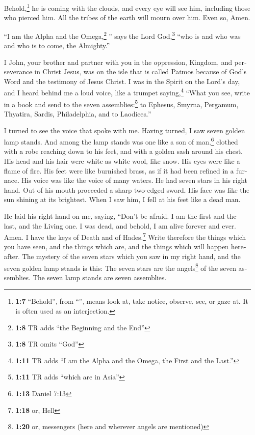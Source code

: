 \begin{paracol}{2}
\begin{otherlanguage}{english}
 Behold,\footnote{\textbf{1:7} ``Behold'', from
  ``'', means look at, take notice, observe, see, or gaze
  at. It is often used as an interjection.} he is coming with the
clouds, and every eye will see him, including those who pierced him. All
the tribes of the earth will mourn over him. Even so, Amen.

 ``I am the Alpha and the Omega,\footnote{\textbf{1:8} TR
  adds ``the Beginning and the End''} '' says the Lord God,\footnote{\textbf{1:8}
  TR omits ``God''} ``who is and who was and who is to come, the
Almighty.''

 I John, your brother and partner with you in the
oppression, Kingdom, and perseverance in Christ Jesus, was on the isle
that is called Patmos because of God's Word and the testimony of Jesus
Christ.  I was in the Spirit on the Lord's day, and I
heard behind me a loud voice, like a trumpet 
saying,\footnote{\textbf{1:11} TR adds ``I am the Alpha and the Omega,
  the First and the Last.''} ``What you see, write in a book and send to
the seven assemblies:\footnote{\textbf{1:11} TR adds ``which are in
  Asia''} to Ephesus, Smyrna, Pergamum, Thyatira, Sardis, Philadelphia,
and to Laodicea.''

 I turned to see the voice that spoke with me. Having
turned, I saw seven golden lamp stands.  And among the
lamp stands was one like a son of man,\footnote{\textbf{1:13} Daniel
  7:13} clothed with a robe reaching down to his feet, and with a golden
sash around his chest.  His head and his hair were white
as white wool, like snow. His eyes were like a flame of fire.
 His feet were like burnished brass, as if it had been
refined in a furnace. His voice was like the voice of many waters.
 He had seven stars in his right hand. Out of his mouth
proceeded a sharp two-edged sword. His face was like the sun shining at
its brightest.  When I saw him, I fell at his feet like a
dead man.

He laid his right hand on me, saying, ``Don't be afraid. I am the first
and the last,  and the Living one. I was dead, and
behold, I am alive forever and ever. Amen. I have the keys of Death and
of Hades.\footnote{\textbf{1:18} or, Hell}  Write
therefore the things which you have seen, and the things which are, and
the things which will happen hereafter.  The mystery of
the seven stars which you saw in my right hand, and the seven golden
lamp stands is this: The seven stars are the angels\footnote{\textbf{1:20}
  or, messengers (here and wherever angels are mentioned)} of the seven
assemblies. The seven lamp stands are seven assemblies.


\end{otherlanguage}
\end{paracol}
